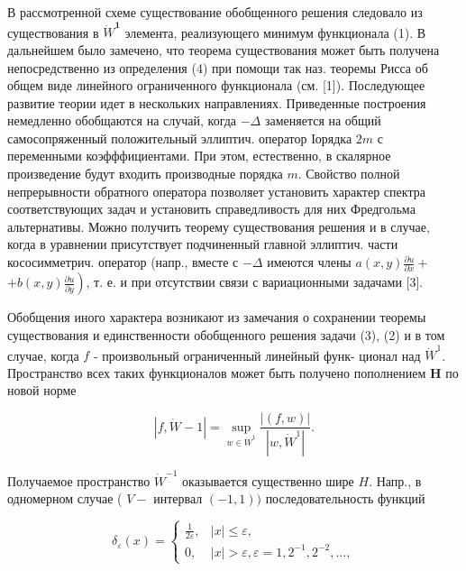 \documentclass[10pt]{article}
\begin{document}
В рассмотренной схеме существование обобщенного решения следовало из существования в $\dot{W}^{\mathbf{1}}$ элемента, реализующего минимум функционала (1). В дальнейшем было замечено, что теорема существования может быть получена непосредственно из определения (4) при помощи так наз. теоремы Рисса об общем виде линейного ограниченного функционала (см. [1]). Последующее развитие теории идет в нескольких направлениях. Приведенные построения немедленно обобщаются на случай, когда $-\Delta$ заменяется на общий самосопряженный положительный эллиптич. оператор Іорядка $2 m$ с переменными коэфффициентами. При этом, естественно, в скалярное произведение будут входить производные порядка $m$. Свойство полной непрерывности обратного оператора позволяет установить характер спектра соответствующих задач и установить справедливость для них Фредгольма альтернативы. Можно получить теорему существования решения и в случае, когда в уравнении присутствует подчиненный главной эллиптич. части кососимметрич. оператор (напр., вместе с $-\Delta$ имеются члены $a(x, y) \frac{\partial u}{\partial x}+$ $\left.+b(x, y) \frac{\partial u}{\partial y}\right)$, т. е. и при отсутствии связи с вариационными задачами [3].



Обобщения иного характера возникают из замечания о сохранении теоремы существования и единственности обобщенного решения задачи (3), (2) и в том случае, когда $f$ - произвольный ограниченный линейный функ- ционал над $\dot{W}^{1}$. Пространство всех таких функционалов может быть получено пополнением $\boldsymbol{H}$ по новой норме



\[

|f, \dot{W}-1|=\sup _{w \in \dot{W}^{1}} \frac{|(f, w)|}{\left|w, \dot{W}^{1}\right|} .

\]



Получаемое пространство $\dot{W}^{-1}$ оказывается существенно шире $H$. Напр., в одномерном случае ( $V-$ интервал $(-1,1))$ последовательность функций



\[

\delta_{\varepsilon}(x)= \begin{cases}\frac{1}{2 \varepsilon}, & |x| \leqslant \varepsilon, \\ 0, & |x|>\varepsilon, \varepsilon=1,2^{-1}, 2^{-2}, \ldots,\end{cases}

\]
\end{document}
